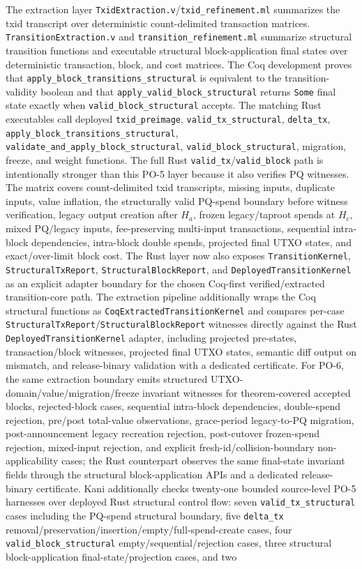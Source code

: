 \documentclass[11pt]{article}
\begin{document}
The extraction layer \texttt{TxidExtraction.v}/\texttt{txid\_refinement.ml} summarizes the txid transcript over deterministic count-delimited transaction matrices. \texttt{TransitionExtraction.v} and \texttt{transition\_refinement.ml} summarize structural transition functions and executable structural block-application final states over deterministic transaction, block, and cost matrices. The Coq development proves that \texttt{apply\_block\_transitions\_structural} is equivalent to the transition-validity boolean and that \texttt{apply\_valid\_block\_structural} returns \texttt{Some} final state exactly when \texttt{valid\_block\_structural} accepts. The matching Rust executables call deployed \texttt{txid\_preimage}, \texttt{valid\_tx\_structural}, \texttt{delta\_tx}, \texttt{apply\_block\_transitions\_structural}, \texttt{validate\_and\_apply\_block\_structural}, \texttt{valid\_block\_structural}, migration, freeze, and weight functions. The full Rust \texttt{valid\_tx}/\texttt{valid\_block} path is intentionally stronger than this PO-5 layer because it also verifies PQ witnesses. The matrix covers count-delimited txid transcripts, missing inputs, duplicate inputs, value inflation, the structurally valid PQ-spend boundary before witness verification, legacy output creation after $H_a$, frozen legacy/taproot spends at $H_c$, mixed PQ/legacy inputs, fee-preserving multi-input transactions, sequential intra-block dependencies, intra-block double spends, projected final UTXO states, and exact/over-limit block cost. The Rust layer now also exposes \texttt{TransitionKernel}, \texttt{StructuralTxReport}, \texttt{StructuralBlockReport}, and \texttt{DeployedTransitionKernel} as an explicit adapter boundary for the chosen Coq-first verified/extracted transition-core path. The extraction pipeline additionally wraps the Coq structural functions as \texttt{CoqExtractedTransitionKernel} and compares per-case \texttt{StructuralTxReport}/\texttt{StructuralBlockReport} witnesses directly against the Rust \texttt{DeployedTransitionKernel} adapter, including projected pre-states, transaction/block witnesses, projected final UTXO states, semantic diff output on mismatch, and release-binary validation with a dedicated certificate. For PO-6, the same extraction boundary emits structured UTXO-domain/value/migration/freeze invariant witnesses for theorem-covered accepted blocks, rejected-block cases, sequential intra-block dependencies, double-spend rejection, pre/post total-value observations, grace-period legacy-to-PQ migration, post-announcement legacy recreation rejection, post-cutover frozen-spend rejection, mixed-input rejection, and explicit fresh-id/collision-boundary non-applicability cases; the Rust counterpart observes the same final-state invariant fields through the structural block-application APIs and a dedicated release-binary certificate. Kani additionally checks twenty-one bounded source-level PO-5 harnesses over deployed Rust structural control flow: seven \texttt{valid\_tx\_structural} cases including the PQ-spend structural boundary, five \texttt{delta\_tx} removal/preservation/insertion/empty/full-spend-create cases, four \texttt{valid\_block\_structural} empty/sequential/rejection cases, three structural block-application final-state/projection cases, and two 
\end{document}
